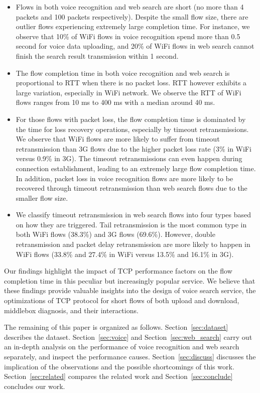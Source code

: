 \begin{itemize}
\item Flows in both voice recognition and web search are short (no more than 4 packets and 100 packets respectively). Despite the small flow size, there are outlier flows experiencing extremely large completion time. For instance, we observe that 10\% of WiFi flows in voice recognition spend more than 0.5 second for voice data uploading, and 20\% of WiFi flows in web search cannot finish the search result transmission within 1 second.

\item The flow completion time in both voice recognition and web search is proportional to RTT when there is no packet loss. RTT however exhibits a large variation, especially in WiFi network. We observe the RTT of WiFi flows ranges from 10 ms to 400 ms with a median around 40 ms. 

\item For those flows with packet loss, the flow completion time is dominated by the time for loss recovery operations, especially by timeout retransmissions. We observe that WiFi flows are more likely to suffer from timeout retransmission than 3G flows due to the higher packet loss rate (3\% in WiFi versus 0.9\% in 3G). The timeout retransmissions can even happen during connection establishment, leading to an extremely large flow completion time. In addition, packet loss in voice recognition flows are more likely to be recovered through timeout retransmission than web search flows due to the smaller flow size.

\item We classify timeout retransmission in web search flows into four types based on how they are triggered. Tail retransmission is the most common type in both WiFi flows (38.3\%) and 3G flows (69.6\%). However, double retransmission and packet delay retransmission are more likely to happen in WiFi flows (33.8\% and 27.4\% in WiFi versus 13.5\% and 16.1\% in 3G).

\end{itemize}

Our findings highlight the impact of TCP performance factors on the flow completion time in this peculiar but increasingly popular service. We believe that these findings provide valuable insights into the design of voice search service, the optimizations of TCP protocol for short flows of both upload and download, middlebox diagnosis, and their interactions.

The remaining of this paper is organized as follows. Section~\ref{sec:dataset} describes the dataset. Section~\ref{sec:voice} and Section~\ref{sec:web_search} carry out an in-depth analysis on the performance of voice recognition and web search separately, and inspect the performance causes. Section~\ref{sec:discuss} discusses the implication of the observations and the possible shortcomings of this work. Section~\ref{sec:related} compares the related work and Section~\ref{sec:conclude} concludes our work. 
